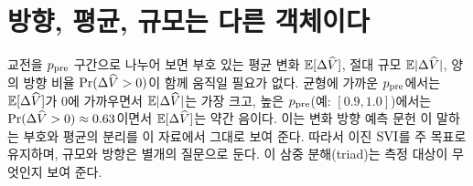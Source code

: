 \section{방향, 평균, 규모는 다른 객체이다}
\label{sec:value-triad}

교전을 $p_{\mathrm{pre}}$ 구간으로 나누어 보면 부호 있는 평균 변화 $\mathbb{E}[\Delta\widehat V]$, 절대 규모 $\mathbb{E}|\Delta\widehat V|$, 양의 방향 비율 $\Pr(\Delta\widehat V > 0)$이 함께 움직일 필요가 없다. 균형에 가까운 $p_{\mathrm{pre}}$에서는 $\mathbb{E}[\Delta\widehat V]$가 0에 가까우면서 $\mathbb{E}|\Delta\widehat V|$는 가장 크고, 높은 $p_{\mathrm{pre}}$(예: $[0.9, 1.0]$)에서는 $\Pr(\Delta\widehat V > 0) \approx 0.63$이면서 $\mathbb{E}[\Delta\widehat V]$는 약간 음이다. 이는 변화 방향 예측 문헌 \cite{ChristoffersenDiebold2006}이 말하는 부호와 평균의 분리를 이 자료에서 그대로 보여 준다. 따라서 이진 $\mathrm{SVI}$를 주 목표로 유지하며, 규모와 방향은 별개의 질문으로 둔다. 이 삼중 분해(triad)는 측정 대상이 무엇인지 보여 준다.
